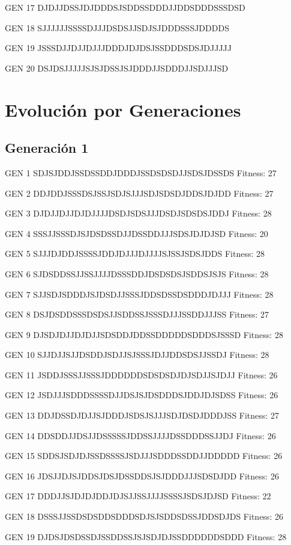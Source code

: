 \documentclass[a4paper,12pt]{article}
\begin{document}
GEN 17 DJDJJDSSJDJDDDSJSDDSSDDDJJDDSDDDSSSDSD

GEN 18 SJJJJJJSSSSDJJJDSDSJJSDJSJDDDSSSJDDDDS

GEN 19 JSSSDJJDJJDJJJDDDJDJDSJSSDDDSDSJDJJJJJ

GEN 20 DSJDSJJJJJSJSJDSSJSJDDDJJSDDDJJSDJJJSD

\section*{Evolución por Generaciones}

\subsection*{Generación 1}
GEN 1 SDJSJDDJSSDSSDDJDDDJSSDSDSDJJSDSJDSSDS Fitness: 27

GEN 2 DDJDDJSSSDSJSSJSDJSJJJSDJSDSDJDDSJDJDD Fitness: 27

GEN 3 DJDJJDJJDJDJJJJDSDJSDSJJJDSDJSDSDSJDDJ Fitness: 28

GEN 4 SSSJJSSSDJSJDSDSSDJJDSSDDJJJSDSJDJDJSD Fitness: 20

GEN 5 SJJJDJDDJSSSSJDDJDJJJDJJJJSJSSJSDSJDDS Fitness: 28

GEN 6 SJDSDDSSJJSSJJJJDSSSDDJDSDSDSJSDDSJSJS Fitness: 28

GEN 7 SJJSDJSDDDJSJDSDJJSSSJDDSDSSDSDDDJDJJJ Fitness: 28

GEN 8 DSJDSDDSSSDSDSJJSDDSSJSSSDJJJSSDDJJJSS Fitness: 27

GEN 9 DJSDJDJJDJDJJSDSDDJDDSSDDDDDSDDDSJSSSD Fitness: 28

GEN 10 SJJDJJSJJDSDDJSDJJSJSSSJDJJDDSDSJJSSDJ Fitness: 28

GEN 11 JSDDJSSSJJSSSJDDDDDDSDSDSDJDJSDJJSJDJJ Fitness: 26

GEN 12 JSDJJJSDDDSSSSDJJDSJSJDSDDDSJDDJDJSDSS Fitness: 26

GEN 13 DDJDSSDJDJJSJDDDJSDSJSJJJSDJDSDJDDDJSS Fitness: 27

GEN 14 DDSDDJJDSJJDSSSSSJDDSSJJJJDSSDDDSSJJDJ Fitness: 26

GEN 15 SDDSJSDJDJSSDSSSSJSDJJJSDDDSSDDJJDDDDD Fitness: 26

GEN 16 JDSJJDJSJDDSJDSJDSSDDSJSJDDDJJJSDSDJDD Fitness: 26

GEN 17 DDDJJSJDJDJDDJDJSJJSSJJJJSSSSJSDSJDJSD Fitness: 22

GEN 18 DSSSJJSSDSDSDDSDDDSDJSJSDDSDSSJDDSDJDS Fitness: 26

GEN 19 DJDSJDSDSSDJSSDDSSJSJSDJDJSSDDDDDDSDDD Fitness: 28
\end{document}
